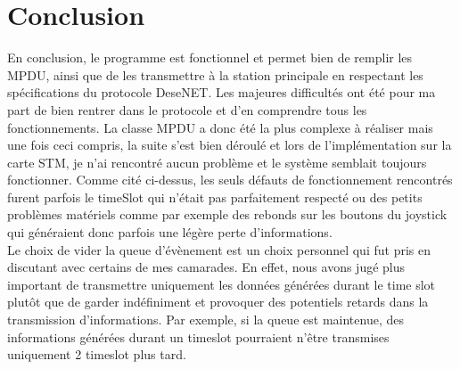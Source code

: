 \documentclass{report}
\begin{document}
\chapter{Conclusion}
En conclusion, le programme est fonctionnel et permet bien de remplir les MPDU, ainsi que de les transmettre à la station principale en respectant les spécifications du protocole DeseNET. Les majeures difficultés ont été pour ma part de bien rentrer dans le protocole et d'en comprendre tous les fonctionnements. La classe MPDU a donc été la plus complexe à réaliser mais une fois ceci compris, la suite s'est bien déroulé et lors de l'implémentation sur la carte STM, je n'ai rencontré aucun problème et le système semblait toujours fonctionner. Comme cité ci-dessus, les seuls défauts de fonctionnement rencontrés furent parfois le timeSlot qui n'était pas parfaitement respecté ou des petits problèmes matériels comme par exemple des rebonds sur les boutons du joystick qui généraient donc parfois une légère perte d'informations. \\
Le choix de vider la queue d'évènement est un choix personnel qui fut pris en discutant avec certains de mes camarades. En effet, nous avons jugé plus important de transmettre uniquement les données générées durant le time slot plutôt que de garder indéfiniment et provoquer des potentiels retards dans la transmission d'informations. Par exemple, si la queue est maintenue, des informations générées durant un timeslot pourraient n'être transmises uniquement 2 timeslot plus tard.
\end{document}
